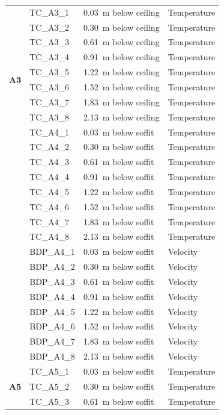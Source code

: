 \documentclass[12pt,oneside]{book}
\begin{document}
\begin{longtable}[c]{c|lll}
 \multirow{10}{*}{\large{\textbf{A3}}}
 & TC\_A3\_1  & 0.03~m below ceiling & Temperature \\
 & TC\_A3\_2  & 0.30~m below ceiling & Temperature \\
 & TC\_A3\_3  & 0.61~m below ceiling & Temperature \\
 & TC\_A3\_4  & 0.91~m below ceiling & Temperature \\
 & TC\_A3\_5  & 1.22~m below ceiling & Temperature \\
 & TC\_A3\_6  & 1.52~m below ceiling & Temperature \\
 & TC\_A3\_7  & 1.83~m below ceiling & Temperature \\
 & TC\_A3\_8  & 2.13~m below ceiling & Temperature \\
\bottomrule
\newpage
\multirow{16}{*}{\large{\textbf{A4}}}
 & TC\_A4\_1  & 0.03~m below soffit  & Temperature \\
 & TC\_A4\_2  & 0.30~m below soffit  & Temperature \\
 & TC\_A4\_3  & 0.61~m below soffit  & Temperature \\
 & TC\_A4\_4  & 0.91~m below soffit  & Temperature \\
 & TC\_A4\_5  & 1.22~m below soffit  & Temperature \\
 & TC\_A4\_6  & 1.52~m below soffit  & Temperature \\
 & TC\_A4\_7  & 1.83~m below soffit  & Temperature \\
 & TC\_A4\_8  & 2.13~m below soffit  & Temperature \\
\cline{2-4}
 & BDP\_A4\_1 & 0.03~m below soffit  & Velocity \\
 & BDP\_A4\_2 & 0.30~m below soffit  & Velocity \\
 & BDP\_A4\_3 & 0.61~m below soffit  & Velocity \\
 & BDP\_A4\_4 & 0.91~m below soffit  & Velocity \\
 & BDP\_A4\_5 & 1.22~m below soffit  & Velocity \\
 & BDP\_A4\_6 & 1.52~m below soffit  & Velocity \\
 & BDP\_A4\_7 & 1.83~m below soffit  & Velocity \\
 & BDP\_A4\_8 & 2.13~m below soffit  & Velocity \\
\midrule
\multirow{16}{*}{\large{\textbf{A5}}}
 & TC\_A5\_1  & 0.03~m below soffit  & Temperature \\
 & TC\_A5\_2  & 0.30~m below soffit  & Temperature \\
 & TC\_A5\_3  & 0.61~m below soffit  & Temperature \\

\end{longtable}
\end{document}
